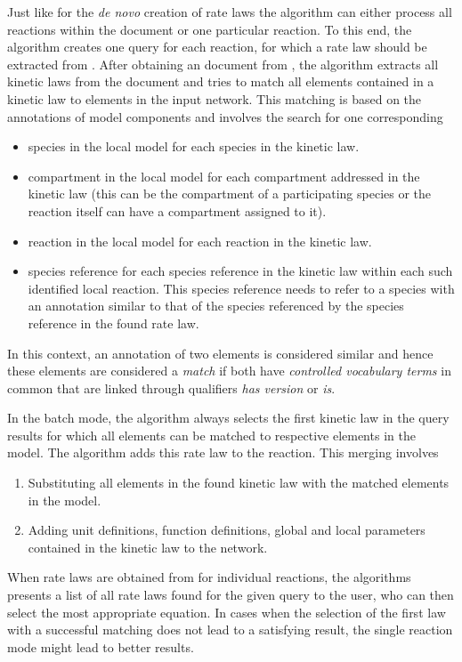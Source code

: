 Just like for the \emph{de novo} creation of rate laws the algorithm can either process all reactions within the \SBML document or one particular reaction.
To this end, the algorithm creates one query \URL for each reaction, for which a rate law should be extracted from \SABIO.
After obtaining an \SBML document from \SABIO, the algorithm extracts all kinetic laws from the \SBML document and tries to match all elements contained in a kinetic law to elements in the input network. 
This matching is based on the \MIRIAM annotations of model components and involves the search for one corresponding
\begin{itemize}
  \item species in the local model for each species in the kinetic law.
  \item compartment in the local model for each compartment addressed in the kinetic law (this can be the compartment of a participating species or the reaction itself can have a compartment assigned to it).
  \item reaction in the local model for each reaction in the kinetic law.
  \item species reference for each species reference in the kinetic law within each such identified local reaction. 
This species reference needs to refer to a species with an annotation similar to that of the species referenced by the species reference in the found rate law.
\end{itemize}
In this context, an annotation of two \SBML elements is considered similar and hence these elements are considered a \emph{match} if both have \emph{controlled vocabulary terms} in common that are linked through qualifiers \emph{has version} or \emph{is}.

In the batch mode, the algorithm always selects the first kinetic law in the query results for which all elements can be matched to respective elements in the model.
The algorithm adds this rate law to the reaction.
This merging involves
\begin{enumerate}
  \item Substituting all elements in the found kinetic law with the matched elements in the model.
  \item Adding unit definitions, function definitions, global and local parameters contained in the kinetic law to the network.
\end{enumerate}

When rate laws are obtained from \SABIO for individual reactions, the algorithms presents a list of all rate laws found for the given query to the user, who can then select the most appropriate equation.
In cases when the selection of the first law with a successful matching does not lead to a satisfying result, the single reaction mode might lead to better results.


